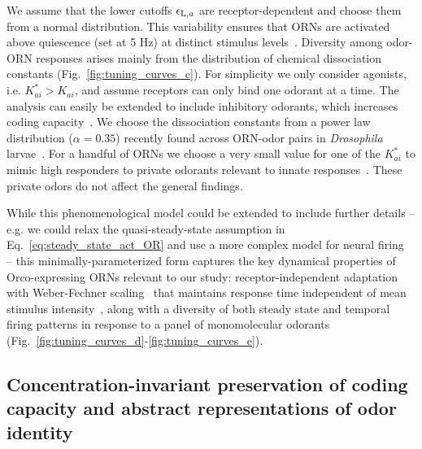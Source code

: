 \documentclass[10pt,prl,aps,showpacs,twocolumn,unsortedaddress]{revtex4-1}
\begin{document}
We assume that the lower cutoffs $\epsilon_{\textup{L}, a}$ are receptor-dependent and choose them from a normal distribution. This variability ensures that ORNs are activated above quiescence (set at 5 Hz) at distinct stimulus levels~\cite{srinivas_elife, martelli}. Diversity among odor-ORN responses arises mainly from the distribution of chemical dissociation constants (Fig.~\ref{fig:tuning_curves_c}). For simplicity we only consider agonists, i.e. $K^*_{ai}>K_{ai}$, and assume receptors can only bind one odorant at a time. The analysis can easily be extended to include inhibitory odorants, which increases coding capacity~\cite{Cao_Tu_WL}. We choose the dissociation constants from a power law distribution ($\alpha = 0.35$) recently found across ORN-odor pairs in \textit{Drosophila} larvae~\cite{si2017invariances}. For a handful of ORNs we choose a very small value for one of the $K^*_{ai}$ to mimic high responders to private odorants relevant to innate responses~\cite{geosmin}. These private odors do not affect the general findings. 
 
While this phenomenological model could be extended to include further details -- e.g. we could relax the quasi-steady-state assumption in Eq.~\ref{eq:steady_state_act_OR} and use a more complex model for neural firing~\cite{srinivas_elife} -- this minimally-parameterized form captures the key dynamical properties of Orco-expressing ORNs relevant to our study: receptor-independent adaptation~\cite{nagel_wilson_biophysical} with Weber-Fechner scaling~\cite{srinivas_elife,cafaro_WL,cao_WL} that maintains response time independent of mean stimulus intensity~\cite{martelli,srinivas_elife}, along with a diversity of both steady state and temporal firing patterns in response to a panel of monomolecular odorants~\cite{hallem_carlson,montague2011similar,stopfer_nat_neuro,stopfer_temporal_channel,stopfer_temporal_model} (Fig.~\ref{fig:tuning_curves_d}-\ref{fig:tuning_curves_e}). 








\subsection*{Concentration-invariant preservation of coding capacity and abstract representations of odor identity}
\end{document}
